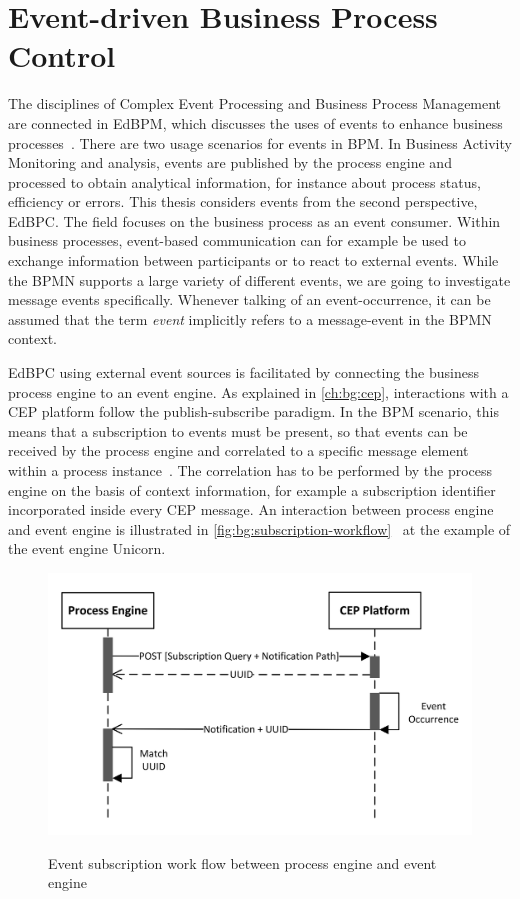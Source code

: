 \section{Event-driven Business Process Control}
The disciplines of Complex Event Processing and Business Process Management are connected in \acf{EdBPM}, which discusses the uses of events to enhance business processes~\cite{evtprocessing}.
There are two usage scenarios for events in BPM. In Business Activity Monitoring and analysis, events are published by the process engine and processed to obtain analytical information, for instance about process status, efficiency or errors.
This thesis considers events from the second perspective, \acf{EdBPC}. The field focuses on the business process as an event consumer.
Within business processes, event-based communication can for example be used to exchange information between participants or to react to external events. While the BPMN supports a large variety of different events, we are going to investigate message events specifically. Whenever talking of an event-occurrence, it can be assumed that the term \textit{event} implicitly refers to a message-event in the BPMN context.

\ac{EdBPC} using external event sources is facilitated by connecting the business process engine to an event engine.
As explained in \autoref{ch:bg:cep}, interactions with a CEP platform follow the publish-subscribe paradigm.
In the BPM scenario, this means that a subscription to events must be present, so that events can be received by the process engine and correlated to a specific message element within a process instance~\cite{Baumgrass2016}.
The correlation has to be performed by the process engine on the basis of context information, for example a subscription identifier incorporated inside every CEP message. 
An interaction between process engine and event engine is illustrated in \autoref{fig:bg:subscription-workflow}~\cite[\,p.\,13]{mandal:2017} at the example of the event engine Unicorn.

\begin{figure}[]
	\myfloatalign
	{\includegraphics[width=0.6\linewidth]{chapters/background/subscription-workflow.png}}
	\caption{Event subscription work flow between process engine and event engine}
	\label{fig:bg:subscription-workflow}
\end{figure}

